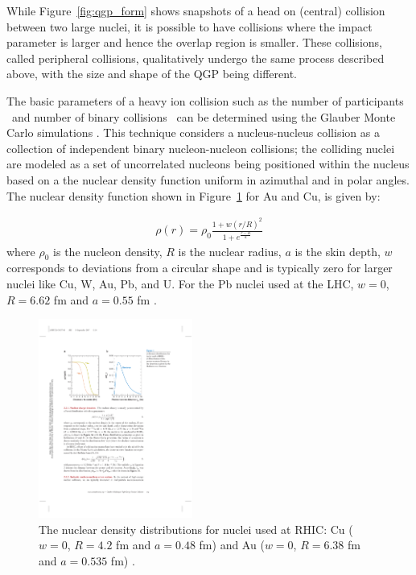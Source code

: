 While Figure~\ref{fig:qgp_form} shows snapshots of a head on (central) collision between two large nuclei, it is possible to have collisions where the impact parameter is larger and hence the overlap region is smaller. These collisions, called peripheral collisions, qualitatively undergo the same process described above, with the size and shape of the QGP being different.


The basic parameters of a heavy ion collision such as the number of participants \Npart\ and number of binary collisions \Ncoll\ can be determined using the Glauber Monte Carlo simulations \cite{glauberArticle, glauberMisc}. This technique considers a nucleus-nucleus collision as a collection of independent binary nucleon-nucleon collisions; the colliding nuclei are modeled as a set of uncorrelated nucleons being positioned within the nucleus based on a the nuclear density function uniform in azimuthal and in polar angles. The nuclear density function shown in Figure~\ref{fig:nuclearDensity} for Au and Cu, is given by:

\begin{align}
\rho(r) = \rho_0 \frac{1 + w (r/R)^2}{1+e^{\frac{r-R}{a}}}
\end{align}
where $\rho_0$ is the nucleon density, $R$ is the nuclear radius, $a$ is the skin depth, $w$ corresponds to deviations from a circular shape and is typically zero for larger nuclei like Cu, W, Au, Pb, and U. For the Pb nuclei used at the LHC, $w = 0$, $R = 6.62$ fm and $a =0.55$ fm \cite{DEVRIES1987495}. 

\begin{figure}[htbp]
\begin{center}
\includegraphics[width=0.45\textwidth]{figures/theory/nuclearDensity}
\caption{ The nuclear density distributions for nuclei used at RHIC: Cu ($w = 0$, $R = 4.2$ fm and $a =0.48$ fm)  and Au ($w = 0$, $R = 6.38$ fm and $a =0.535$ fm) \cite{doi:10.1146/annurev.nucl.57.090506.123020, DEVRIES1987495}.}
\label{fig:nuclearDensity}
\end{center}
\end{figure}

